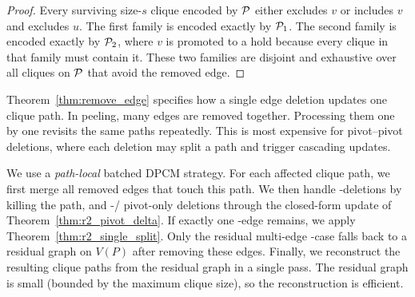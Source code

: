 \begin{proof}
Every surviving size-$s$ clique encoded by $\TPath$ either excludes $v$ or includes $v$ and excludes $u$.
%
The first family is encoded exactly by $\TPath_1$.
%
The second family is encoded exactly by $\TPath_2$, where $v$ is promoted to a hold because every clique in that family must contain it.
%
These two families are disjoint and exhaustive over all cliques on $\TPath$ that avoid the removed edge.
\end{proof}



Theorem~\ref{thm:remove_edge} specifies how a single edge deletion updates one clique path.
In peeling, many edges are removed together.
Processing them one by one revisits the same paths repeatedly.
This is most expensive for pivot--pivot deletions, where each deletion may split a path and trigger cascading updates.

We use a \emph{path-local} batched DPCM strategy.
For each affected clique path, we first merge all removed edges that touch this path.
We then handle \hold-\hold deletions by killing the path, and \hold-\pivot / pivot-only deletions through the closed-form update of Theorem~\ref{thm:r2_pivot_delta}.
If exactly one \pivot-\pivot edge remains, we apply Theorem~\ref{thm:r2_single_split}.
Only the residual multi-edge \pivot-\pivot case falls back to a residual graph on $V(P)$ after removing these edges.
Finally, we reconstruct the resulting clique paths from the residual graph in a single pass.
The residual graph is small (bounded by the maximum clique size), so the reconstruction is efficient.


